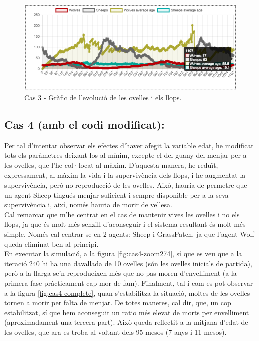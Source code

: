 \documentclass{article} %
\begin{document}
{	\begin{figure}[H]
		\begin{changemargin}{-1cm}{0.5cm}
			\includegraphics[width=14cm]{mod_case_10_graph_2}
			\centering
			\color{blue}
			\caption{Cas 3 - Gràfic de l'evolució de les ovelles i els llops.}\label{visina8}
		\end{changemargin}
	\end{figure}

	\subsection*{Cas 4 (amb el codi modificat):}

	Per tal d'intentar observar els efectes d'haver afegit la variable edat, he modificat tots els paràmetres deixant-los al mínim, excepte el del guany del menjar per a les ovelles, que l'he col·locat al màxim. D'aquesta manera, he reduït, expressament, al màxim la vida i la supervivència dels llops, i he augmentat la supervivència, però no reproducció de les ovelles. Això, hauria de permetre que un agent Sheep tingués menjar suficient i sempre disponible per a la seva supervivència i, així, només hauria de morir de vellesa. \\

	Cal remarcar que m'he centrat en el cas de mantenir vives les ovelles i no els llops, ja que és molt més senzill d'aconseguir i el sistema resultant és molt més simple. Només cal centrar-se en 2 agents: Sheep i GrassPatch, ja que l'agent Wolf queda eliminat ben al principi. \\

	En executar la simulació, a la figura \ref{fig:cas4-zoom274}, sí que es veu que a la iteració 240 hi ha una davallada de 10 ovelles (són les ovelles inicials de partida), però a la llarga se'n reprodueixen més que no pas moren d'envelliment (a la primera fase pràcticament cap mor de fam). Finalment, tal i com es pot observar a la figura \ref{fig:cas4-complete}, quan s'estabilitza la situació, moltes de les ovelles tornen a morir per falta de menjar. De totes maneres, cal dir, que, un cop estabilitzat, sí que hem aconseguit un ratio més elevat de morts per envelliment (aproximadament una tercera part). Això queda reflectit a la mitjana d'edat de les ovelles, que ara es troba al voltant dels 95 mesos (7 anys i 11 mesos).\\

}
\end{document}
